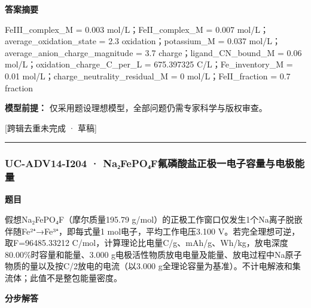 \documentclass[UTF8,11pt,a4paper]{ctexart}
\begin{document}
\noindent\textbf{答案摘要}\par
FeIII\_complex\_M = 0.003 mol/L；FeII\_complex\_M = 0.007 mol/L；average\_oxidation\_state = 2.3 oxidation；potassium\_M = 0.037 mol/L；average\_anion\_charge\_magnitude = 3.7 charge；ligand\_CN\_bound\_M = 0.06 mol/L；oxidation\_charge\_C\_per\_L = 675.397325 C/L；Fe\_inventory\_M = 0.01 mol/L；charge\_neutrality\_residual\_M = 0 mol/L；FeII\_fraction = 0.7 fraction\par
\noindent\textbf{模型前提：}
仅采用题设理想模型，全部问题仍需专家科学与版权审查。\par
\noindent\textcolor{red!65!black}{[跨辑去重未完成 · 草稿]} \par
\medskip\hrule\medskip
{}
\subsubsection*{UC-ADV14-I204 · Na₂FePO₄F氟磷酸盐正极一电子容量与电极能量}
\noindent\textbf{题目}\par
假想Na₂FePO₄F（摩尔质量195.79 g/mol）的正极工作窗口仅发生1个Na离子脱嵌伴随Fe²⁺→Fe³⁺，即每式量1 mol电子，平均工作电压3.100 V。若完全理想可逆，取F=96485.33212 C/mol，计算理论比电量C/g、mAh/g、Wh/kg，放电深度80.00\%时容量和能量、3.000 g电极活性物质放电电量及能量、放电过程中Na原子物质的量以及按C/2放电的电流（以3.000 g全理论容量为基准）。不计电解液和集流体；此值不是整包能量密度。\par
\medskip\noindent\textbf{分步解答}
\end{document}
